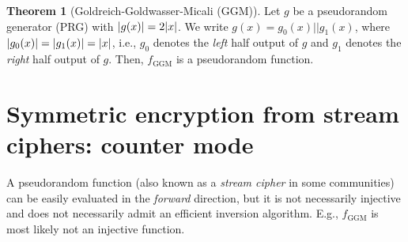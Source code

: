 \documentclass[a4paper,table,dvipsnames]{article}
\theoremstyle{definition}
\newtheorem*{theorem}{Theorem}
\begin{document}

\begin{theorem}[Goldreich-Goldwasser-Micali (GGM)]
Let $g$ be a pseudorandom generator (PRG) with $\abs{g(x)}=2\abs{x}$. We write $g(x)=g_0(x)||g_1(x)$, where $\left\lvert g_0(x)\right\rvert=\left\lvert g_1(x)\right\rvert=\left\lvert x\right\rvert$, i.e., $g_0$ denotes the \emph{left} half output of $g$ and $g_1$ denotes the \emph{right} half output of $g$.
Then, $f_{\text{GGM}}$ is a pseudorandom function.
\end{theorem}

\section{Symmetric encryption from stream ciphers: counter mode}\label{sec:ctr}
A pseudorandom function (also known as a \emph{stream cipher} in some communities) can
be easily evaluated in the \emph{forward} direction, but it is not necessarily
injective and does not necessarily admit an efficient inversion algorithm. E.g., $f_{\text{GGM}}$
is most likely not an injective function.
\end{document}
